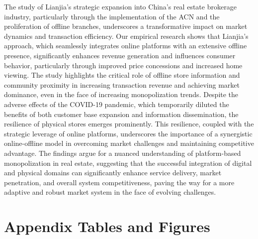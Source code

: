\documentclass[12pt]{article}
\begin{document}
The study of Lianjia's strategic expansion into China's real estate brokerage industry, particularly through the implementation of the ACN and the proliferation of offline branches, underscores a transformative impact on market dynamics and transaction efficiency. Our empirical research shows that Lianjia's approach, which seamlessly integrates online platforms with an extensive offline presence, significantly enhances revenue generation and influences consumer behavior, particularly through improved price concessions and increased home viewing. The study highlights the critical role of offline store information and community proximity in increasing transaction revenue and achieving market dominance, even in the face of increasing monopolization trends. Despite the adverse effects of the COVID-19 pandemic, which temporarily diluted the benefits of both customer base expansion and information dissemination, the resilience of physical stores emerges prominently. This resilience, coupled with the strategic leverage of online platforms, underscores the importance of a synergistic online-offline model in overcoming market challenges and maintaining competitive advantage. The findings argue for a nuanced understanding of platform-based monopolization in real estate, suggesting that the successful integration of digital and physical domains can significantly enhance service delivery, market penetration, and overall system competitiveness, paving the way for a more adaptive and robust market system in the face of evolving challenges.

\clearpage
\begin{singlespace}
%
%


\end{singlespace}


\newpage
\appendix
\setcounter{table}{0}
\renewcommand{\tablename}{Appendix Table}
\renewcommand{\figurename}{Appendix Figure}
\renewcommand{\thetable}{A\arabic{table}}
\setcounter{figure}{0}
\renewcommand{\thefigure}{A\arabic{figure}}

\section{Appendix Tables and Figures}
% 


\end{document}
